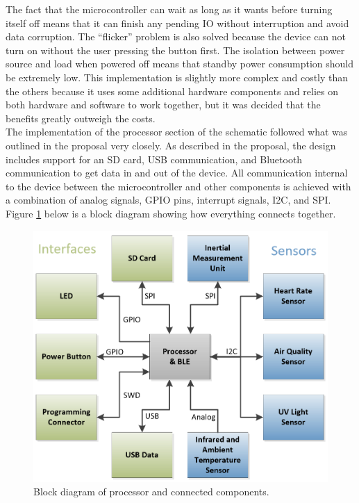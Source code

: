 The fact that the microcontroller can wait as long as it wants before turning 
itself off means that it can finish any pending IO without interruption and 
avoid data corruption. The “flicker” problem is also solved because the device 
can not turn on without the user pressing the button first. The isolation 
between power source and load when powered off means that standby power 
consumption should be extremely low. This implementation is slightly more 
complex and costly than the others because it uses some additional hardware 
components and relies on both hardware and software to work together, but it 
was decided that the benefits greatly outweigh the costs. \\

The implementation of the processor section of the schematic followed what was 
outlined in the proposal very closely. As described in 
the proposal, the design includes support for an SD card, USB communication, 
and Bluetooth communication to get data in and out of the device. All 
communication internal to the device between the microcontroller and other 
components is achieved with a combination of analog signals, GPIO pins, 
interrupt signals, I2C, and SPI. Figure \ref{fig:BlockDiagram_Processor} below 
is a block diagram showing how everything connects together.

\begin{figure}[!htb]
\centering
\includegraphics[scale=0.46]{images/BlockDiagram_Processor.png}
\caption{Block diagram of processor and connected components.}
\label{fig:BlockDiagram_Processor}
\end{figure}

